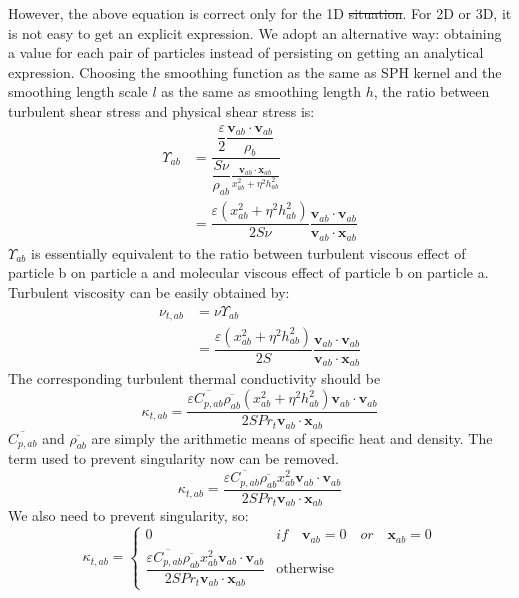 \documentclass[gmd, manuscript]{copernicus} %
\providecommand{\DIFadd}[1]{{\protect\color{blue}\uwave{#1}}} %
\providecommand{\DIFdel}[1]{{\protect\color{red}\sout{#1}}}                      %
\providecommand{\DIFaddbegin}{} %
\providecommand{\DIFaddend}{} %
\providecommand{\DIFdelbegin}{} %
\providecommand{\DIFdelend}{} %
\begin{document}
However, the above equation is correct only for the 1D \DIFdelbegin \DIFdel{situation}\DIFdelend \DIFaddbegin \DIFadd{situations}\DIFaddend . For 2D or 3D, it is not easy to get an explicit expression. 
We adopt an alternative way: obtaining a value for each pair of particles instead of persisting on getting an analytical expression. Choosing the smoothing function as the same as SPH kernel and the smoothing length scale $l$ as the same as smoothing length $h$, the ratio between turbulent shear stress and physical shear stress is: 
\begin{equation}
\begin{split}
\Upsilon_{ab} &= \dfrac{\dfrac{\varepsilon}{2} \dfrac{\textbf{v}_{ab} \cdot \textbf{v}_{ab}}{\rho_b}}{\dfrac{S \nu}{\rho_{ab}} \frac{\textbf{v}_{ab} \cdot \textbf{x}_{ab}}{x_{ab}^2 + \eta^2 h_{ab}^2}} \\
 & = \dfrac{\varepsilon \left(x_{ab}^2 + \eta^2 h_{ab}^2\right)}{2 S \nu} \dfrac{\textbf{v}_{ab} \cdot \textbf{v}_{ab}}{\textbf{v}_{ab} \cdot \textbf{x}_{ab}}
\end{split}
\end{equation}
$\Upsilon_{ab}$ is essentially equivalent to the ratio between turbulent viscous effect of particle b on particle a and molecular viscous effect of particle b on particle a. Turbulent viscosity can be easily obtained by:
\begin{equation}
\begin{split}
\nu_{t,ab} &= \nu \Upsilon_{ab} \\
&= \dfrac{\varepsilon \left(x_{ab}^2 + \eta^2 h_{ab}^2\right)}{2 S} \dfrac{\textbf{v}_{ab} \cdot \textbf{v}_{ab}}{\textbf{v}_{ab} \cdot \textbf{x}_{ab}}
\end{split}
\end{equation}
The corresponding turbulent thermal conductivity should be
\begin{equation}
\kappa_{t,ab}=\dfrac{\varepsilon \overline{C_{p,ab}} \overline{\rho_{ab}} \left(x_{ab}^2 + \eta^2 h_{ab}^2\right) \textbf{v}_{ab} \cdot \textbf{v}_{ab}}{2 S Pr_t\textbf{v}_{ab} \cdot \textbf{x}_{ab}}
\end{equation}
$\overline{C_{p,ab}}$ and $\overline{\rho_{ab}}$ are simply the arithmetic means of specific heat and density. The term used to prevent singularity now can be removed. 
\begin{equation}
\kappa_{t,ab}=\dfrac{\varepsilon \overline{C_{p,ab}} \overline{\rho_{ab}} x_{ab}^2 \textbf{v}_{ab} \cdot \textbf{v}_{ab}}{2 S Pr_t\textbf{v}_{ab} \cdot \textbf{x}_{ab} }
\end{equation}
We also need to prevent singularity, so: 
\begin{equation}
\kappa_{t,ab}= 
\begin{cases} 
      0 & if  \quad \textbf{v}_{ab}=0 \quad or \quad \textbf{x}_{ab}=0 \\
      \dfrac{\varepsilon \overline{C_{p,ab}} \overline{\rho_{ab}} x_{ab}^2 \textbf{v}_{ab} \cdot \textbf{v}_{ab}}{2 S Pr_t\textbf{v}_{ab} \cdot \textbf{x}_{ab} } & \text{otherwise}
\end{cases}
\label{eq:SPH-LANS-heat-conductivity}
\end{equation}
\end{document}
